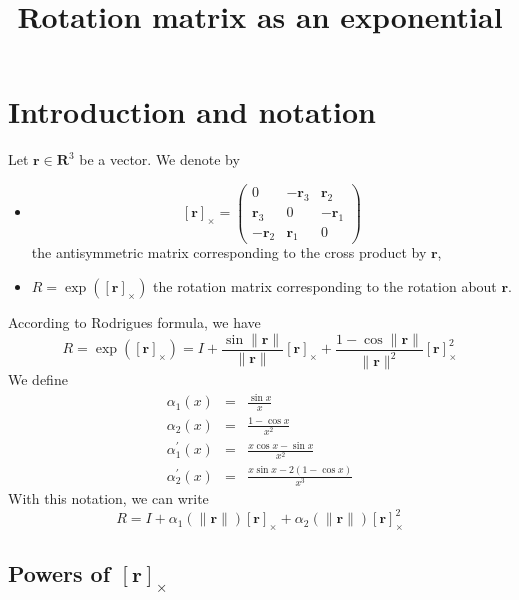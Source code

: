 \documentclass {article}
\title {Rotation matrix as an exponential}
\newcommand\reals{\mathbf{R}}
\newcommand\rot{\mathbf{r}}
\newcommand\rcross{[\rot]_{\times}}
\newcommand\normr{\|\rot\|}
\newcommand\alphap{\alpha^{\prime}}
\begin{document}
\maketitle

\section {Introduction and notation}

Let $\rot\in\reals^3$ be a vector. We denote by
\begin{itemize}
\item $$
\rcross = \left(\begin{array}{ccc}
0 & -\rot_3 & \rot_2 \\
\rot_3 & 0 & -\rot_1 \\
-\rot_2 & \rot_1 & 0
\end{array}\right)
$$
the antisymmetric matrix corresponding to the cross product by $\rot$,
\item $R = \exp (\rcross)$ the rotation matrix corresponding to the rotation about
$\rot$.
\end{itemize}
According to Rodrigues formula, we have
\begin{equation}\label{eq:rodrigues}
R = \exp (\rcross) = I + \frac{\sin \normr}{\normr}\rcross +
\frac{1 - \cos \normr}{\normr^2}\rcross^2
\end{equation}
We define
\begin{eqnarray}
\label{eq:alpha1}
\alpha_1 (x) &=& \frac{\sin x}{x}\\
\label{eq:alpha2}
\alpha_2 (x) &=& \frac{1 - \cos x}{x^2}\\
\label{eq:alpha3}
\alphap_1 (x) &=& \frac{x \cos x - \sin x}{x^2}\\
\label{eq:alpha4}
\alphap_2 (x) &=& \frac{x \sin x -2(1-\cos x)}{x^3}
\end{eqnarray}
With this notation, we can write
\begin{equation}\label{eq:rodrigues2}
R = I + \alpha_1 (\normr) \rcross + \alpha_2 (\normr) \rcross^2
\end{equation}
\subsection {Powers of $\rcross$}
\end{document}
